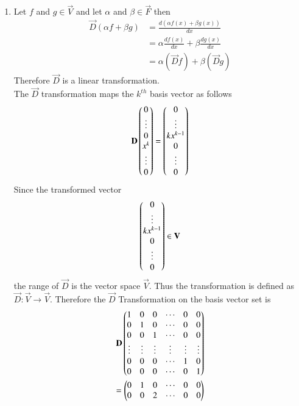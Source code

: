 \begin{enumerate}[label=\emph{\alph*)}]
\item
Let $f$ and $g \in \vec{V}$ and let $\alpha$ and $\beta \in \vec{F}$ then 
		\begin{align}
			\vec{D}(\alpha f + \beta g)&=\frac{d(\alpha f(x) + \beta g(x))}{dx} \\
			&=\alpha\frac{df(x)}{dx}+\beta\frac{dg(x)}{dx}\\
			&=\alpha(\vec{D}f)+\beta(\vec{D}g)
		\end{align}
Therefore $\vec{D}$ is a linear transformation.\\
The $\vec{D}$ transformation maps the $k^{th}$ basis vector as follows
		\begin{align}
			\mathbf{D}\begin{pmatrix}0\\\vdots\\0\\x^k\\\vdots\\0\end{pmatrix}
			=\begin{pmatrix}0\\\vdots\\kx^{k-1}\\0\\\vdots\\0\end{pmatrix}
		\end{align}
Since the transformed vector 
		\begin{align}
			\begin{pmatrix}0\\\vdots\\kx^{k-1}\\0\\\vdots\\0\end{pmatrix} \in \mathbf{V}
		\end{align}
the range of $\vec{D}$ is the vector space $\vec{V}$. Thus the transformation is defined as
$\vec{D}:\vec{V} \rightarrow \vec{V}$.
Therefore the $\vec{D}$ Transformation on the basis vector set is
		\begin{align}
			\mathbf{D}\begin{pmatrix}1 & 0 & 0 & \cdots & 0 & 0\\
				      0 & 1 & 0 & \cdots & 0 & 0 \\
				      0 & 0 & 1 & \cdots & 0 & 0 \\
				      \vdots & \vdots & \vdots & \vdots & \vdots & \vdots\\
				      0 & 0 & 0 & \cdots & 1 & 0 \\
				      0 & 0 & 0 & \cdots & 0 & 1\end{pmatrix}\\
			      =\begin{pmatrix}0 & 1 & 0 & \cdots & 0 & 0\\
				      0 & 0 & 2 & \cdots & 0 & 0\\
\end{pmatrix}
\end{align}
\end{enumerate}
